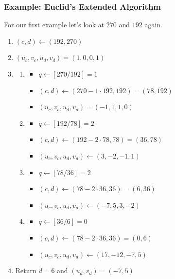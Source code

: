 \documentclass{beamer}
\newcommand{\<}{\langle}
\renewcommand{\>}{\rangle}
\begin{document}
\begin{frame}
\frametitle{Example: Euclid's Extended Algorithm}

For our first example let's look at $270$ and $192$ again.
\begin{enumerate}[(1)]
\item $(c,d) \leftarrow (192, 270)$
\item $(u_c, v_c, u_d, v_d) = (1, 0, 0, 1)$
\item  \begin{enumerate}[(Round 1)]
 \item           
          \begin{itemize}
          \item $q \leftarrow [270/192] = 1$
          \item $(c,d) \leftarrow (270-1\cdot 192, 192) = (78, 192)$
          \item $(u_c, v_c, u_d, v_d) = (-1, 1, 1, 0)$
          \end{itemize}
 \item 
          \begin{itemize}
          \item $q \leftarrow [192/78] = 2$
          \item $(c,d) \leftarrow (192 - 2\cdot 78, 78)  = (36, 78)$
          \item $(u_c, v_c, u_d, v_d) \leftarrow (3, -2, -1, 1)$
          \end{itemize}
  \item
  		\begin{itemize}
          \item $q \leftarrow [78/36] = 2$
          \item $(c,d) \leftarrow (78-2\cdot 36, 36) = (6,36)$
          \item $(u_c, v_c, u_d, v_d) \leftarrow (-7, 5, 3, -2)$
  		\end{itemize}
  \item 
         \begin{itemize}
          \item $q \leftarrow [36/6] = 0$
          \item $(c,d) \leftarrow (78-2\cdot 36, 36) = (0,6)$
          \item $(u_c, v_c, u_d, v_d) \leftarrow (17, -12, -7, 5)$
  		\end{itemize}
\end{enumerate}
\item Return $d=6$ and $(u_d, v_d) = (-7, 5)$
\end{enumerate}
\end{frame}
\end{document}

